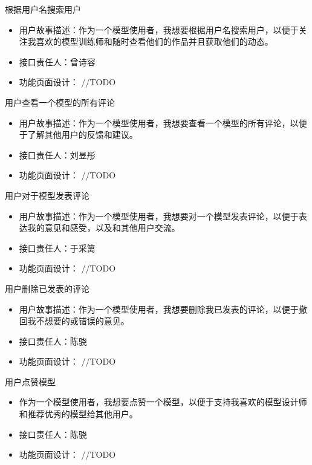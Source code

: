 \begin{frame}{根据用户名搜索用户}
    \begin{itemize}
        \item 用户故事描述：作为一个模型使用者，我想要根据用户名搜索用户，以便于关注我喜欢的模型训练师和随时查看他们的作品并且获取他们的动态。
        \item 接口责任人：曾诗容
        \item 功能页面设计： //TODO
    \end{itemize}
\end{frame}

\begin{frame}{用户查看一个模型的所有评论}
    \begin{itemize}
        \item 用户故事描述：作为一个模型使用者，我想要查看一个模型的所有评论，以便于了解其他用户的反馈和建议。
        \item 接口责任人：刘昱彤
        \item 功能页面设计： //TODO
    \end{itemize}
\end{frame}

\begin{frame}{用户对于模型发表评论}
    \begin{itemize}
        \item 用户故事描述：作为一个模型使用者，我想要对一个模型发表评论，以便于表达我的意见和感受，以及和其他用户交流。
        \item 接口责任人：于采篱
        \item 功能页面设计： //TODO
    \end{itemize}
\end{frame}

\begin{frame}{用户删除已发表的评论}
    \begin{itemize}
        \item 用户故事描述：作为一个模型使用者，我想要删除我已发表的评论，以便于撤回我不想要的或错误的意见。
        \item 接口责任人：陈骁
        \item 功能页面设计： //TODO
    \end{itemize}
\end{frame}

\begin{frame}{用户点赞模型}
    \begin{itemize}
        \item 作为一个模型使用者，我想要点赞一个模型，以便于支持我喜欢的模型设计师和推荐优秀的模型给其他用户。
        \item 接口责任人：陈骁
        \item 功能页面设计： //TODO
    \end{itemize}
\end{frame}

